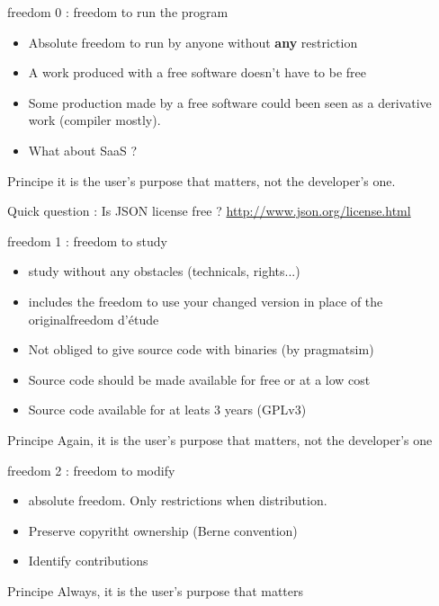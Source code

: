 \documentclass{beamer}
\begin{document}
\begin{frame}{freedom 0 : freedom to run the program}
  \begin{itemize}
  \item Absolute freedom to run by anyone without \textbf{any} restriction
  \item A work produced with a free software doesn't have to be free
  \item Some production made by a free software could been seen as a derivative work (compiler mostly).
  \item What about SaaS ?
  \end{itemize}

  \begin{alertblock}{Principe}
     it is the user's purpose that matters, not the developer's one.
  \end{alertblock}
  
  Quick question : Is JSON license free ? \url{http://www.json.org/license.html}

\end{frame}


\begin{frame}{freedom 1 : freedom to study}
  \begin{itemize}
  \item study without any obstacles (technicals, rights...)
  \item includes the freedom to use your changed version in place of the originalfreedom d'étude
  \item Not obliged to give source code with binaries (by pragmatsim)
  \item Source code should be made available for free or at a low cost
  \item Source code available for at leats 3 years (GPLv3)
  \end{itemize}
  \begin{alertblock}{Principe}
    Again, it is the user's purpose that matters, not the developer's one
  \end{alertblock}
\end{frame}


\begin{frame}{freedom 2 : freedom to modify}
  \begin{itemize}
  \item absolute freedom. Only restrictions when distribution.
  \item Preserve copyritht ownership (Berne convention)
  \item Identify  contributions
  \end{itemize}
\begin{alertblock}{Principe}
    Always, it is the user's purpose that matters
  \end{alertblock}
\end{frame}
\end{document}
